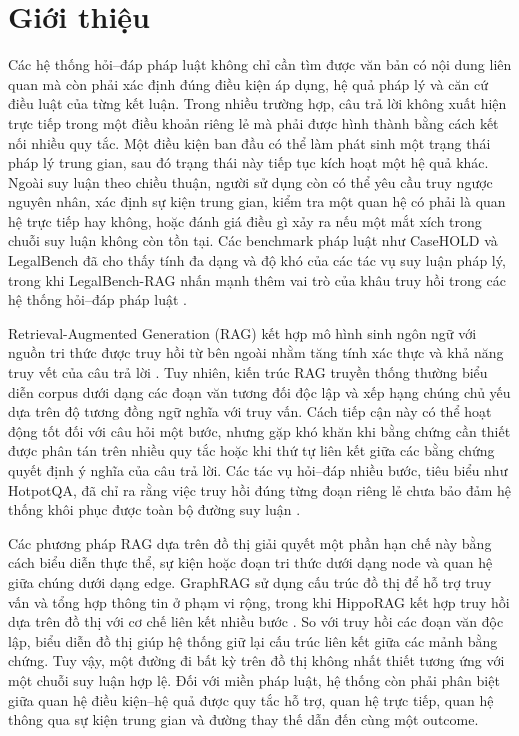 \section{Giới thiệu}
\label{sec:introduction}

Các hệ thống hỏi--đáp pháp luật không chỉ cần tìm được văn bản có nội dung
liên quan mà còn phải xác định đúng điều kiện áp dụng, hệ quả pháp lý và căn
cứ điều luật của từng kết luận. Trong nhiều trường hợp, câu trả lời không
xuất hiện trực tiếp trong một điều khoản riêng lẻ mà phải được hình thành
bằng cách kết nối nhiều quy tắc. Một điều kiện ban đầu có thể làm phát sinh
một trạng thái pháp lý trung gian, sau đó trạng thái này tiếp tục kích hoạt
một hệ quả khác. Ngoài suy luận theo chiều thuận, người sử dụng còn có thể
yêu cầu truy ngược nguyên nhân, xác định sự kiện trung gian, kiểm tra một
quan hệ có phải là quan hệ trực tiếp hay không, hoặc đánh giá điều gì xảy ra
nếu một mắt xích trong chuỗi suy luận không còn tồn tại. Các benchmark pháp
luật như CaseHOLD và LegalBench đã cho thấy tính đa dạng và độ khó của các
tác vụ suy luận pháp lý, trong khi LegalBench-RAG nhấn mạnh thêm vai trò của
khâu truy hồi trong các hệ thống hỏi--đáp pháp luật
\cite{zheng2021casehold,guha2023legalbench,alami2024legalbenchrags}.

Retrieval-Augmented Generation (RAG) kết hợp mô hình sinh ngôn ngữ với nguồn
tri thức được truy hồi từ bên ngoài nhằm tăng tính xác thực và khả năng truy
vết của câu trả lời \cite{lewis2020rag}. Tuy nhiên, kiến trúc RAG truyền
thống thường biểu diễn corpus dưới dạng các đoạn văn tương đối độc lập và
xếp hạng chúng chủ yếu dựa trên độ tương đồng ngữ nghĩa với truy vấn. Cách
tiếp cận này có thể hoạt động tốt đối với câu hỏi một bước, nhưng gặp khó
khăn khi bằng chứng cần thiết được phân tán trên nhiều quy tắc hoặc khi thứ
tự liên kết giữa các bằng chứng quyết định ý nghĩa của câu trả lời. Các tác
vụ hỏi--đáp nhiều bước, tiêu biểu như HotpotQA, đã chỉ ra rằng việc truy hồi
đúng từng đoạn riêng lẻ chưa bảo đảm hệ thống khôi phục được toàn bộ đường
suy luận \cite{yang2018hotpotqa}.

Các phương pháp RAG dựa trên đồ thị giải quyết một phần hạn chế này bằng cách
biểu diễn thực thể, sự kiện hoặc đoạn tri thức dưới dạng node và quan hệ giữa
chúng dưới dạng edge. GraphRAG sử dụng cấu trúc đồ thị để hỗ trợ truy vấn và
tổng hợp thông tin ở phạm vi rộng, trong khi HippoRAG kết hợp truy hồi dựa
trên đồ thị với cơ chế liên kết nhiều bước
\cite{edge2024graphrag,gutierrez2024hipporag}. So với truy hồi các đoạn văn
độc lập, biểu diễn đồ thị giúp hệ thống giữ lại cấu trúc liên kết giữa các
mảnh bằng chứng. Tuy vậy, một đường đi bất kỳ trên đồ thị không nhất thiết
tương ứng với một chuỗi suy luận hợp lệ. Đối với miền pháp luật, hệ thống
còn phải phân biệt giữa quan hệ điều kiện--hệ quả được quy tắc hỗ trợ, quan
hệ trực tiếp, quan hệ thông qua sự kiện trung gian và đường thay thế dẫn đến
cùng một outcome.

